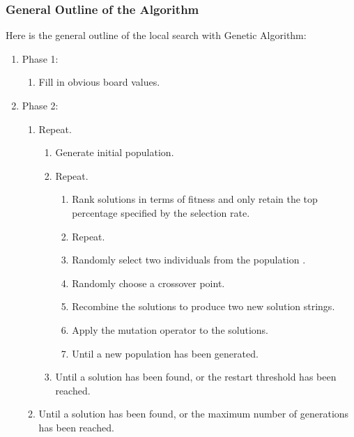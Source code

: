 \documentclass[12pt, a4paper]{article}
\begin{document}
			\subsubsection{General Outline of the Algorithm}
			Here is the general outline of the local search with Genetic Algorithm:
				\begin{enumerate}
					\item Phase 1:
					\begin{enumerate}
						\item Fill in obvious board values.
					\end{enumerate}
					\item Phase 2:
					\begin{enumerate}
						\item Repeat.
						\begin{enumerate}
							\item Generate initial population.													\item Repeat.
							\begin{enumerate}
								\item Rank solutions in terms of fitness and only retain the top percentage specified by the selection rate.
								\item Repeat.
								\item Randomly select two individuals from the population	.
								\item Randomly choose a crossover point.												\item Recombine the solutions to produce two new solution strings.
								\item Apply the mutation operator to the solutions.

								\item Until a new population has been generated.
							\end{enumerate}
							\item Until a solution has been found, or the restart threshold has been reached.
						\end{enumerate}
						\item Until a solution has been found, or the maximum number of generations has been reached.
					\end{enumerate}
				\end{enumerate} 
\end{document}
